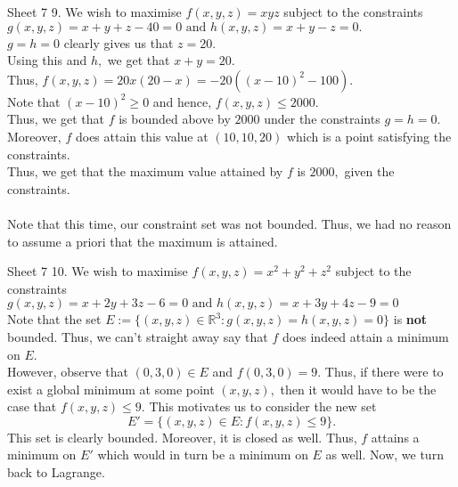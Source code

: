 \documentclass[handout, aspectratio=169]{beamer}
\begin{document}
\begin{frame}{Sheet 7}
	9. We wish to maximise $f(x, y, z)=x y z$ subject to the constraints $g(x, y, z) = x+y+z - 40 = 0 \text { and } h(x, y, z) = x+y - z = 0.$\\
	$g = h = 0$ clearly gives us that $z = 20.$\\
	Using this and $h,$ we get that $x + y = 20.$\\
	Thus, $f(x, y, z) = 20x(20 - x) = -20\left((x-10)^2 - 100\right).$\\
	Note that $(x-10)^2\ge0$ and hence, $f(x, y, z) \le 2000.$\\
	Thus, we get that $f$ is bounded above by $2000$ under the constraints $g=h=0.$\\
	Moreover, $f$ does attain this value at $(10, 10, 20)$ which is a point satisfying the constraints.\\
	Thus, we get that the maximum value attained by $f$ is $2000,$ given the constraints.\\~\\
	Note that this time, our constraint set was not bounded. Thus, we had no reason to assume a priori that the maximum is attained.
\end{frame}
\begin{frame}{Sheet 7}
	10. We wish to maximise $f(x, y, z)=x^2 + y^2 + z^2$ subject to the constraints $g(x, y, z) = x+2 y+3 z - 6=0 \text { and }  h(x, y, z) = x+3 y+4 z - 9= 0$\\
	Note that the set $E := \{(x, y, z) \in \mathbb{R}^3 : g(x, y, z) = h(x, y, z) = 0\}$ is \textbf{not} bounded. Thus, we can't straight away say that $f$ does indeed attain a minimum on $E.$\\
	However, observe that $(0, 3, 0) \in E$ and $f(0, 3, 0) = 9.$ Thus, if there were to exist a global minimum at some point $(x, y, z),$ then it would have to be the case that $f(x, y, z) \le 9.$ This motivates us to consider the new set
	\[E' = \{(x, y, z) \in E: f(x, y, z) \le 9\}.\]
	This set is clearly bounded. Moreover, it is closed as well. Thus, $f$ attains a minimum on $E'$ which would in turn be a minimum on $E$ as well. Now, we turn back to Lagrange.
\end{frame}
	
\end{document}
